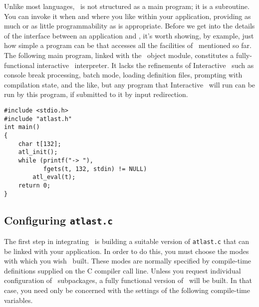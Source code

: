 \documentclass[twocolumn]{article}
\begin{document}
Unlike most languages, \atlast\ is not structured as a main program; it
is a subroutine.  You can invoke it when and where you like within
your application, providing as much or as little programmability as is
appropriate.  Before we get into the details of the interface between
an application and \atlast , it's worth showing, by example, just how
simple a program can be that accesses all the facilities of
\atlast\ mentioned so far.  The following main program, linked with the
\atlast\ object module, constitutes a fully-functional interactive
\atlast\ interpreter.  It lacks the refinements of Interactive \atlast\
such as console break processing, batch mode, loading definition
files, prompting with compilation state, and the like, but any program
that Interactive \atlast\ will run can be run by this program, if
submitted to it by input redirection.

\begin{verbatim}
#include <stdio.h>
#include "atlast.h"
int main()
{
    char t[132];
    atl_init();
    while (printf("-> "),
           fgets(t, 132, stdin) != NULL)
        atl_eval(t);
    return 0;
}
\end{verbatim}

\subsection{Configuring {\tt atlast.c}}

\label{`gconf'}
The first step in integrating \atlast\ is building a suitable version
of {\tt atlast.c} that can be linked with your application.  In order
to do this, you must choose the modes with which you wish \atlast\
built.  These modes are normally specified by compile-time
definitions supplied on the C compiler call line.  Unless you request
individual configuration of \atlast\ subpackages, a fully functional
version of \atlast\ will be built.  In that case, you need only be
concerned with the settings of the following compile-time variables.
\end{document}
